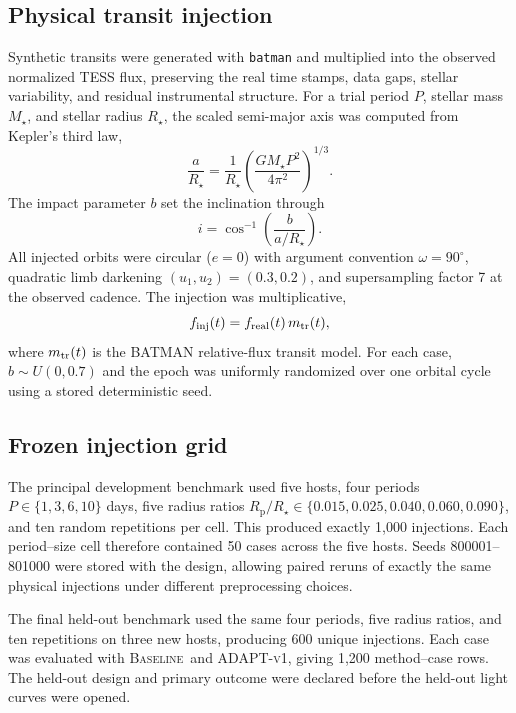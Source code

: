 \documentclass[11pt]{article}
\newcommand{\rprs}{$R_{\mathrm p}/R_\star$}
\newcommand{\adapt}{\textsc{ADAPT-v1}}
\newcommand{\baseline}{\textsc{Baseline}}
\begin{document}
\subsection{Physical transit injection}
Synthetic transits were generated with \texttt{batman} \cite{Kreidberg2015} and multiplied into the observed normalized TESS flux, preserving the real time stamps, data gaps, stellar variability, and residual instrumental structure. For a trial period $P$, stellar mass $M_\star$, and stellar radius $R_\star$, the scaled semi-major axis was computed from Kepler's third law,
\begin{equation}
\frac{a}{R_\star}=\frac{1}{R_\star}\left(\frac{G M_\star P^2}{4\pi^2}\right)^{1/3}.
\end{equation}
The impact parameter $b$ set the inclination through
\begin{equation}
i=\cos^{-1}\left(\frac{b}{a/R_\star}\right).
\end{equation}
All injected orbits were circular ($e=0$) with argument convention $\omega=90^\circ$, quadratic limb darkening $(u_1,u_2)=(0.3,0.2)$, and supersampling factor 7 at the observed cadence. The injection was multiplicative,
\begin{equation}
f_{\rm inj}(t)=f_{\rm real}(t)\,m_{\rm tr}(t),
\end{equation}
where $m_{\rm tr}(t)$ is the BATMAN relative-flux transit model. For each case, $b\sim U(0,0.7)$ and the epoch was uniformly randomized over one orbital cycle using a stored deterministic seed.

\subsection{Frozen injection grid}
The principal development benchmark used five hosts, four periods $P\in\{1,3,6,10\}$ days, five radius ratios \rprs$\in\{0.015,0.025,0.040,0.060,0.090\}$, and ten random repetitions per cell. This produced exactly 1,000 injections. Each period--size cell therefore contained 50 cases across the five hosts. Seeds 800001--801000 were stored with the design, allowing paired reruns of exactly the same physical injections under different preprocessing choices.

The final held-out benchmark used the same four periods, five radius ratios, and ten repetitions on three new hosts, producing 600 unique injections. Each case was evaluated with \baseline\ and \adapt, giving 1,200 method--case rows. The held-out design and primary outcome were declared before the held-out light curves were opened.
\end{document}
